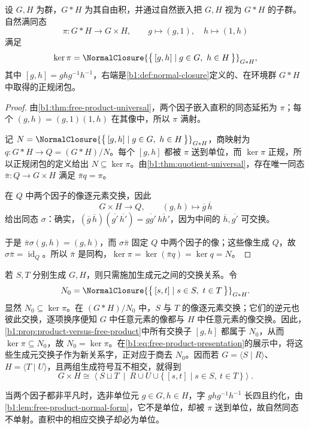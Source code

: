 \begin{proposition}\label{b1:prop:product-versus-free-product}
	设 \(G,H\) 为群，\(G*H\) 为其自由积，并通过自然嵌入把 \(G,H\) 视为 \(G*H\) 的子群。自然满同态
	\[
		\pi:G*H\longrightarrow G\times H,\qquad g\longmapsto(g,1),\quad h\longmapsto(1,h)
	\]
	满足
	\[
		\ker\pi =\NormalClosure{\bigl\{\,[g,h]\mid g\in G,\ h\in H\,\bigr\}}_{G*H},
	\]
	其中 \([g,h]=ghg^{-1}h^{-1}\)，右端是\cref{b1:def:normal-closure}定义的、在环境群 \(G*H\) 中取得的正规闭包。
\end{proposition}
\begin{proof}
	由\cref{b1:thm:free-product-universal}，两个因子嵌入直积的同态延拓为 \(\pi\)；每个 \((g,h)=(g,1)(1,h)\) 在其像中，所以 \(\pi\) 满射。

	记 \(N=\NormalClosure{\bigl\{\,[g,h]\mid g\in G,\ h\in H\,\bigr\}}_{G*H}\)，商映射为 \(q:G*H\to Q=(G*H)/N\)。每个 \([g,h]\) 都被 \(\pi\) 送到单位，而 \(\ker\pi\) 正规，所以正规闭包的定义给出 \(N\subseteq\ker\pi\)。由\cref{b1:thm:quotient-universal}，存在唯一同态 \(\bar\pi:Q\to G\times H\) 满足 \(\bar\pi q=\pi\)。

	在 \(Q\) 中两个因子的像逐元素交换，因此
	\[
		G\times H\longrightarrow Q,\qquad (g,h)\longmapsto \overline g\,\overline h
	\]
	给出同态 \(\sigma\)：确实，\((\overline g\,\overline h)(\overline {g'}\,\overline {h'})=\overline {gg'}\,\overline {hh'}\)，因为中间的 \(\overline h,\overline {g'}\) 可交换。

	于是 \(\bar\pi\sigma(g,h)=(g,h)\)，而 \(\sigma\bar\pi\) 固定 \(Q\) 中两个因子的像；这些像生成 \(Q\)，故 \(\sigma\bar\pi=\operatorname{id}_Q\)。所以 \(\bar\pi\) 是同构，\(\ker\pi=\ker(\bar\pi q)=\ker q=N\)。
\end{proof}

若 \(S,T\) 分别生成 \(G,H\)，则只需施加生成元之间的交换关系。令
\[
	N_0=\NormalClosure{\bigl\{\,[s,t]\mid s\in S,\ t\in T\,\bigr\}}_{G*H}.
\]
显然 \(N_0\subseteq\ker\pi\)。在 \((G*H)/N_0\) 中，\(S\) 与 \(T\) 的像逐元素交换；它们的逆元也彼此交换，逐项换序便知 \(G\) 中任意元素的像都与 \(H\) 中任意元素的像交换。因此，\cref{b1:prop:product-versus-free-product}中所有交换子 \([g,h]\) 都属于 \(N_0\)，从而 \(\ker\pi\subseteq N_0\)，故 \(N_0=\ker\pi\)。在\eqref{b1:eq:free-product-presentation}的展示中，将这些生成元交换子作为新关系字，正对应于商去 \(N_0\)。因而若 \(G=\langle S\mid R\rangle\)、\(H=\langle T\mid U\rangle\)，且两组生成符号互不相交，就得到
\[
	G\times H\cong \left\langle S\sqcup T\ \middle|\ R\cup U\cup \{\,[s,t]\mid s\in S,\ t\in T\,\}\right\rangle.
\]

当两个因子都非平凡时，选非单位元 \(g\in G,h\in H\)，字 \(ghg^{-1}h^{-1}\) 长四且约化，由\cref{b1:lem:free-product-normal-form}，它不是单位，却被 \(\pi\) 送到单位，故自然同态不单射。直积中的相应交换子却必为单位。

